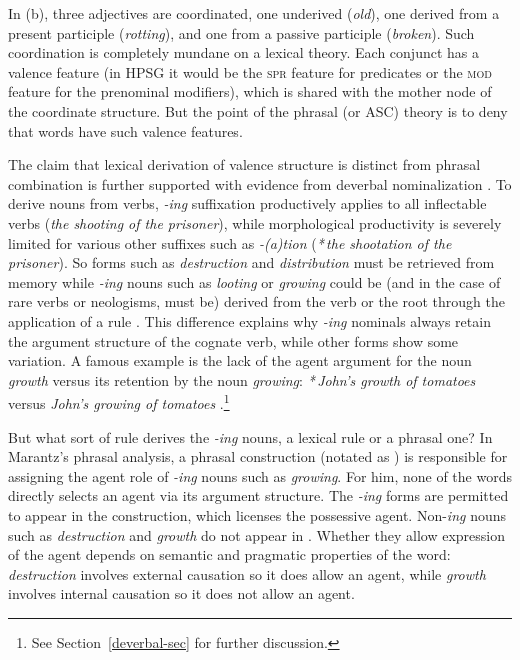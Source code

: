 \noindent
In (b), three adjectives are coordinated, one underived (\emph{old}), one derived from a
present participle (\emph{rotting}), and one from a passive participle (\emph{broken}).  Such
coordination is completely mundane on a lexical theory.  Each \azero conjunct has a valence feature
(in HPSG it would be the \textsc{spr} feature for predicates or the \textsc{mod} feature for the prenominal
modifiers), which is shared with the mother node of the coordinate structure.  But the point of the
phrasal (or ASC) theory is to deny that words have such valence features.   

The claim that lexical derivation of valence structure is distinct from phrasal combination is
further supported with evidence from deverbal nominalization \citep{Wechsler2008a}.  To derive nouns
from verbs, \emph{-ing} suffixation productively applies to all inflectable verbs (\emph{the shooting
  of the prisoner}), while morphological productivity is severely limited for various other suffixes
such as \emph{-(a)tion} (\emph{*\,the shootation of the prisoner}).  So forms such as \emph{destruction}
and \emph{distribution} must be retrieved from memory while \emph{-ing} nouns such as \emph{looting} or
\emph{growing} could be (and in the case of rare verbs or neologisms, must be) derived from the verb
or the root through the application of a rule \citep{Zucchi93a-u}.  
This difference explains why \emph{-ing} nominals always retain the argument structure of the cognate verb, while other forms show
some variation.  A famous example is the lack of the agent argument for the noun \emph{growth} versus
its retention by the noun \emph{growing}: \emph{*\,John's growth of tomatoes} versus \emph{John's growing
  of tomatoes} \citep{Chomsky70a}.\footnote{%
  See Section~\ref{deverbal-sec} for further discussion.} 
  
But what sort of rule derives the \emph{-ing} nouns, a lexical rule or a phrasal one?  
In Marantz's \citeyearpar{Marantz97a} phrasal analysis,  a phrasal
construction (notated as \vP) is responsible for assigning the agent role 
of  \emph{-ing} nouns such as \emph{growing}.  For him, none of the words directly selects an agent via its argument structure.
The \emph{-ing} forms are
permitted to appear in the \vP construction, which licenses the possessive agent.  
Non-\emph{ing} nouns such as \emph{destruction} and  \emph{growth} do not appear in \vP.  Whether they allow
expression of the agent depends on semantic and pragmatic properties of the word: \emph{destruction} involves external 
causation so it does allow an agent, while \emph{growth} involves internal causation so it does not allow an agent.

